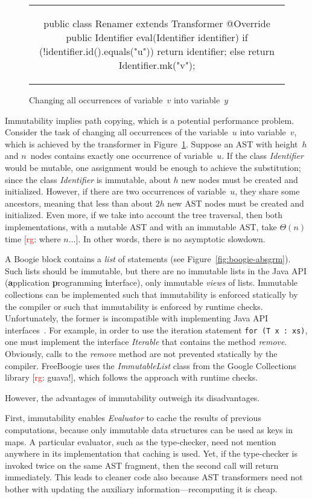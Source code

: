 \documentclass{llncs}
\newcommand{\jmlCode}{\lstinline[style=jml,basicstyle=\normalsize]}
\def\fb#1{{\bf #1}} %
\newcommand{\rg}[1]{{\small [\textcolor{red}{rg}: #1]}}
\newcommand{\bc}{\begin{figure}\centering\begin{tabular}{c}} %
\newcommand{\ec}[2]{\end{tabular}\caption{#1}\label{#2}\end{figure}} %
\begin{document}
\bc
\begin{jml}
public class Renamer extends Transformer {
  @Override public Identifier eval(Identifier identifier) {
    if (!identifier.id().equals("u")) return identifier;
    else return Identifier.mk("v");
  }
}
\end{jml}
\ec{Changing all occurrences of variable~$v$ into variable~$y$}
{lst:example-transformer}

Immutability implies path copying, which is a potential performance
problem. Consider the task of changing all occurrences of the variable~$u$
into variable~$v$, which is achieved by the transformer in
Figure~\ref{lst:example-transformer}. Suppose an AST with height~$h$ and
$n$~nodes contains exactly one occurrence of variable~$u$. If the class
\textit{Identifier} would be mutable, one assignment would be enough to
achieve the substitution; since the class \textit{Identifier} is immutable,
about $h$ new nodes must be created and initialized. However, if there are
two occurrences of variable~$u$, they share some ancestors, meaning that
less than about $2h$ new AST nodes must be created and initialized. Even
more, if we take into account the tree traversal, then both
implementations, with a mutable AST and with an immutable AST, take
$\Theta(n)$ time \rg{where $n\ldots$}. In other words, there is no
asymptotic slowdown.

A Boogie block contains a \emph{list} of statements (see
Figure~\ref{fig:boogie-absgrm}). Such lists should be immutable,
but there are no immutable lists in the Java API (\fb application
\fb programming \fb interface), only immutable \emph{views} of
lists. Immutable collections can be implemented such that
immutability is enforced statically by the compiler or such
that immutability is enforced by runtime checks. Unfortunately,
the former is incompatible with implementing Java API
interfaces~\cite{javaCollectFaq}. For example, in order to use
the iteration statement
\jmlCode|for (T x : xs)|,
one must implement the interface \textit{Iterable} that
contains the method \textit{remove}. Obviously, calls to
the \textit{remove} method are not prevented statically by
the compiler. FreeBoogie uses the \textit{ImmutableList}
class from the Google Collections~\cite{google-collect}
library \rg{guava!}, which follows the approach with runtime checks.

However, the advantages of immutability outweigh its
disadvantages.

First, immutability enables \textit{Evaluator} to cache the
results of previous computations, because only immutable data
structures can be used as keys in maps. A particular evaluator,
such as the type-checker, need not mention anywhere in its
implementation that caching is used. Yet, if the type-checker
is invoked twice on the same AST fragment, then the second call
will return immediately. This leads to cleaner code also because
AST transformers need not bother with updating the auxiliary
information---recomputing it is cheap.
\end{document}
